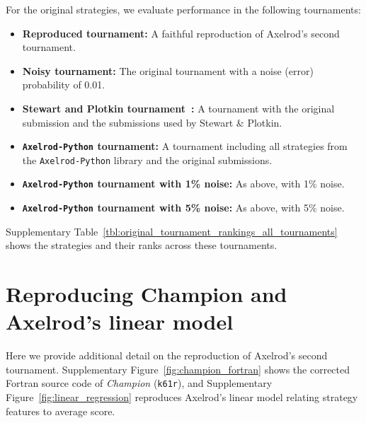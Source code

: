 \documentclass{article}
\newcommand{\AXL}{\texttt{Axelrod-Python}}
\begin{document}
For the original strategies, we evaluate performance in the following
tournaments:
\begin{itemize}
    \item \textbf{Reproduced tournament:} A faithful reproduction of Axelrod's second tournament.
    \item \textbf{Noisy tournament:} The original tournament with a noise (error) probability of 0.01.
    \item \textbf{Stewart and Plotkin tournament~\cite{Stewart2012}:} A tournament with the original submission and the submissions used by Stewart \& Plotkin.
    \item \textbf{\AXL{} tournament:} A tournament including all strategies from the \AXL{} library and the original submissions.
    \item \textbf{\AXL{} tournament with 1\% noise:} As above, with 1\% noise.
    \item \textbf{\AXL{} tournament with 5\% noise:} As above, with 5\% noise.
\end{itemize}

Supplementary Table~\ref{tbl:original_tournament_rankings_all_tournaments} shows
the strategies and their ranks across these tournaments.

\begin{table}[!hbtp]
    \resizebox{\textwidth}{!}{
    \centering
    }
    \caption{\textbf{Ranks of the original strategies across different tournaments.}}
    \label{tbl:original_tournament_rankings_all_tournaments}
\end{table}


\section{Reproducing Champion and Axelrod's linear model}\label{app:reproduction_details}

Here we provide additional detail on the reproduction of Axelrod's second
tournament. Supplementary Figure~\ref{fig:champion_fortran} shows the corrected
Fortran source code of \emph{Champion} (\texttt{k61r}), and
Supplementary Figure~\ref{fig:linear_regression} reproduces Axelrod's linear
model relating strategy features to average score.
\end{document}
